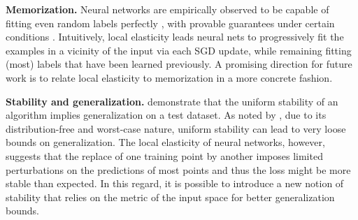 {\bf Memorization.} Neural networks are empirically observed to be capable of fitting even random labels perfectly \citep{zhang2016understanding}, with provable guarantees under certain conditions \citep{allen2019convergence, du2019gradient2,oymak2019towards}. Intuitively, local elasticity leads neural nets to progressively fit the examples in a vicinity of the input via each SGD update, while remaining fitting (most) labels that have been learned previously. A promising direction for future work is to relate local elasticity to memorization in a more concrete fashion.

{\bf Stability and generalization.} \cite{bousquet2002stability} demonstrate that the uniform stability of an algorithm implies generalization on a test dataset. As noted by \cite{kuzborskij2018data}, due to its distribution-free and worst-case nature, uniform stability can lead to very loose bounds on generalization. The local elasticity of neural networks, however, suggests that the replace of one training point by another imposes limited perturbations on the predictions of most points and thus the loss might be more stable than expected. In this regard, it is possible to introduce a new notion of stability that relies on the metric of the input space for better generalization bounds. 

